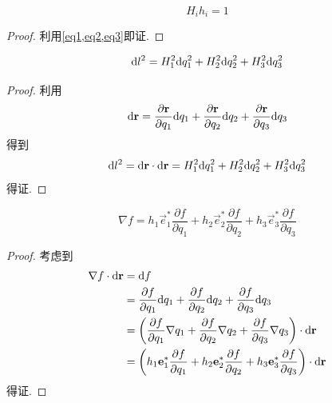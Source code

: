 \begin{theorem}
    \begin{equation}
        H_i h_i = 1
    \end{equation}
\end{theorem}

\begin{proof}
    利用\cref{eq1,eq2,eq3}即证.
\end{proof}

\begin{theorem}
    \begin{equation}
        \mathrm{d} l^2 = H_1^2\mathrm{d} q_1^2+ H_2^2\mathrm{d} q_2^2+ H_3^2\mathrm{d} q_3^2
    \end{equation}
\end{theorem}

\begin{proof}
    利用
    $$
    \mathrm{d}\mathbf{r}=\frac{\partial \mathbf{r}}{\partial q_1}\mathrm{d} q_1+\frac{\partial \mathbf{r}}{\partial q_2}\mathrm{d} q_2+\frac{\partial \mathbf{r}}{\partial q_3}\mathrm{d} q_3
    $$
    得到
    $$
    \mathrm{d} l^2 = \mathrm{d} \mathbf{r}\cdot \mathrm{d} \mathbf{r}= H_1^2\mathrm{d} q_1^2+ H_2^2\mathrm{d} q_2^2+ H_3^2\mathrm{d} q_3^2
    $$
    得证.
\end{proof}

\begin{theorem}[曲线坐标系中的梯度]
    \begin{equation}
        \nabla f = h_1\vec e_1^* \frac{\partial f}{\partial q_1}+h_2\vec e_2^* \frac{\partial f}{\partial q_2}+h_3\vec e_3^* \frac{\partial f}{\partial q_3}
    \end{equation}
\end{theorem}

\begin{proof}
    考虑到
    \begin{align*}
        \nabla f \cdot \mathrm{d} \mathbf{r} &= \mathrm{d} f \\
        &= \frac{\partial f}{\partial q_1}\mathrm{d} q_1+\frac{\partial f}{\partial q_2}\mathrm{d} q_2+\frac{\partial f}{\partial q_3}\mathrm{d} q_3\\
        &= \left( \frac{\partial f}{\partial q_1}\nabla q_1+\frac{\partial f}{\partial q_2}\nabla q_2+\frac{\partial f}{\partial q_3}\nabla q_3 \right) \cdot \mathrm{d} \mathbf{r}\\
        &= \left( h_1\mathbf{e}_1^* \frac{\partial f}{\partial q_1}+h_2\mathbf{e}_2^* \frac{\partial f}{\partial q_2}+h_3\mathbf{e}_3^* \frac{\partial f}{\partial q_3} \right) \cdot \mathrm{d} \mathbf{r}\\
    \end{align*}
    得证.
\end{proof}

